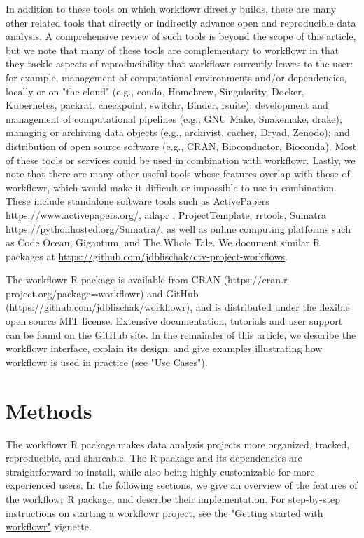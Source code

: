 \documentclass[9pt,a4paper]{extarticle}
\begin{document}
In addition to these tools on which workflowr directly builds, there are
many other related tools that directly or indirectly advance open and
reproducible data analysis. A comprehensive review of such tools is
beyond the scope of this article, but we note that many of these tools
are complementary to workflowr in that they tackle aspects of
reproducibility that workflowr currently leaves to the user: for
example, management of computational environments and/or dependencies,
locally or on "the cloud" (e.g., conda, Homebrew, Singularity, Docker,
Kubernetes, packrat, checkpoint, switchr, Binder, rsuite); development
and management of computational pipelines (e.g., GNU Make, Snakemake,
drake); managing or archiving data objects (e.g., archivist, cacher,
Dryad, Zenodo); and distribution of open source software (e.g., CRAN,
Bioconductor, Bioconda). Most of these tools or services could be used
in combination with workflowr. Lastly, we note that there are many other
useful tools whose features overlap with those of workflowr, which would
make it difficult or impossible to use in combination. These include
standalone software tools such as ActivePapers
\url{https://www.activepapers.org/}, adapr \cite{Gelfond2018},
ProjectTemplate, rrtools, Sumatra
\url{https://pythonhosted.org/Sumatra/}, as well as online computing
platforms such as Code Ocean, Gigantum, and The Whole Tale. We document
similar R packages at
\url{https://github.com/jdblischak/ctv-project-workflows}.

The workflowr R package is available from CRAN
(https://cran.r-project.org/package=workflowr) and GitHub
(https://github.com/jdblischak/workflowr), and is distributed under the
flexible open source MIT license. Extensive documentation, tutorials and
user support can be found on the GitHub site. In the remainder of this
article, we describe the workflowr interface, explain its design, and
give examples illustrating how workflowr is used in practice (see "Use
Cases").


\section*{Methods}

The workflowr R package makes data analysis projects more organized,
tracked, reproducible, and shareable. The R package and its dependencies
are straightforward to install, while also being highly customizable for
more experienced users. In the following sections, we give an overview
of the features of the workflowr R package, and describe their
implementation. For step-by-step instructions on starting a workflowr
project, see the
\href{https://jdblischak.github.io/workflowr/articles/wflow-01-getting-started.html}{"Getting
started with workflowr"} vignette.
\end{document}
